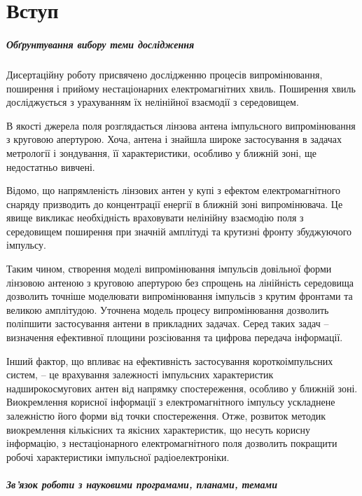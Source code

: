 \chapter*{Вступ}

\paragraph{Обґрунтування вибору теми дослідження}

Дисертаційну роботу присвячено дослідженню процесів випромінювання, поширення 
і прийому нестаціонарних електромагнітних хвиль. Поширення хвиль досліджується 
з урахуванням їх нелінійної взаємодії з середовищем. 

В якості джерела поля розглядається лінзова антена імпульсного випромінювання 
з круговою апертурою. Хоча, антена і знайшла широке застосування в задачах 
метрології і зондування, її характеристики, особливо у ближній зоні, 
ще недостатньо вивчені.

Відомо, що напрямленість лінзових антен у купі з ефектом електромагнітного 
снаряду призводить до концентрації енергії в ближній зоні випромінювача. Це 
явище викликає необхідність враховувати нелінійну взаємодію поля з середовищем 
поширення при значній амплітуді та крутизні фронту збуджуючого імпульсу.

Таким чином, створення моделі випромінювання імпульсів довільної 
форми лінзовою антеною з круговою апертурою без спрощень на лінійність 
середовища дозволить точніше моделювати випромінювання імпульсів з 
крутим фронтами та великою амплітудою. Уточнена модель процесу 
випромінювання дозволить поліпшити застосування антени в прикладних 
задачах. Серед таких задач -- визначення ефективної площини 
розсіювання та цифрова передача інформації.

Інший фактор, що впливає на ефективність застосування короткоімпульсних
систем, -- це врахування залежності імпульсних характеристик 
надширокосмугових антен від напрямку спостереження, особливо у ближній зоні. 
Виокремлення корисної інформації з електромагнітного імпульсу ускладнене 
залежністю його форми від точки спостереження. Отже, 
розвиток методик виокремлення кількісних та якісних характеристик, що несуть 
корисну інформацію, з нестаціонарного електромагнітного поля дозволить 
покращити робочі характеристики імпульсної радіоелектроніки.

\paragraph{Зв'язок роботи з науковими програмами, планами, темами}

